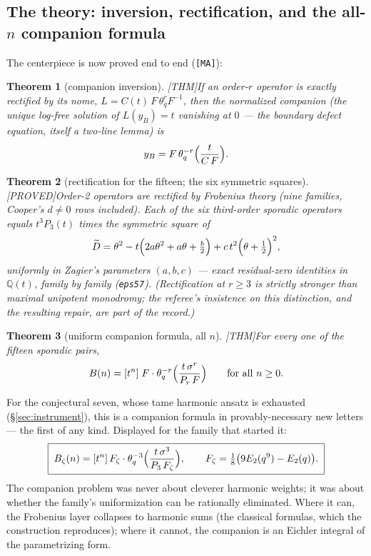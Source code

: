 \documentclass[11pt,reqno]{amsart}
\theoremstyle{plain}
\newtheorem{theorem}{Theorem}[section]
\theoremstyle{definition}
\theoremstyle{remark}
\newcommand{\Q}{\mathbb{Q}}
\newcommand{\thq}{\theta_q}
\newcommand{\Thm}{\textup{\textsf{[THM]}}}
\newcommand{\Proved}{\textup{\textsf{[PROVED]}}}
\newcommand{\MA}{\texttt{[MA]}}
\begin{document}
\subsection{The theory: inversion, rectification, and the all-$n$
companion formula}
The centerpiece is now proved end to end (\MA):

\begin{theorem}[companion inversion]\label{thm:inv}
\Thm\quad If an order-$r$ operator is exactly rectified by its nome,
$L=C(t)\,F\,\thq^rF^{-1}$, then the normalized companion (the unique
log-free solution of $L(y_B)=t$ vanishing at $0$ --- the \emph{boundary
defect} equation, itself a two-line lemma) is
\[
y_B=F\,\thq^{-r}\Bigl(\frac t{C\,F}\Bigr).
\]
\end{theorem}

\begin{theorem}[rectification for the fifteen; the six symmetric
squares]\label{thm:sym2}
\Proved\quad Order-2 operators are rectified by Frobenius theory (nine
families, Cooper's $d\neq0$ rows included). Each of the six third-order
sporadic operators equals $t^3P_3(t)$ times the symmetric square of
\[
\widetilde D=\theta^2-t\Bigl(2a\theta^2+a\theta+\tfrac b2\Bigr)
+c\,t^2\Bigl(\theta+\tfrac12\Bigr)^2,
\]
uniformly in Zagier's parameters $(a,b,c)$ --- exact residual-zero
identities in $\Q(t)$, family by family (\texttt{eps57}). (Rectification
at $r\ge3$ is strictly stronger than maximal unipotent monodromy; the
referee's insistence on this distinction, and the resulting repair, are
part of the record.)
\end{theorem}

\begin{theorem}[uniform companion formula, all $n$]\label{thm:comp}
\Thm\quad For every one of the fifteen sporadic pairs,
\[
B(n)=[t^n]\;F\cdot\thq^{-r}\Bigl(\frac{t\,\sigma^r}{P_r\,F}\Bigr)
\qquad\text{for all }n\ge0 .
\]
\end{theorem}

For the conjectural seven, whose tame harmonic ansatz is exhausted
(\S\ref{sec:instrument}), this is a companion formula in
provably-necessary new letters --- the first of any kind. Displayed for
the family that started it:
\[
\boxed{\;B_\zeta(n)=[t^n]\,F_\zeta\cdot\thq^{-3}
\Bigl(\frac{t\,\sigma^3}{P_3\,F_\zeta}\Bigr),\qquad
F_\zeta=\tfrac18\bigl(9E_2(q^9)-E_2(q)\bigr).\;}
\]
The companion problem was never about cleverer harmonic weights; it was
about whether the family's uniformization can be rationally eliminated.
Where it can, the Frobenius layer collapses to harmonic sums (the
classical formulas, which the construction reproduces); where it cannot,
the companion is an Eichler integral of the parametrizing form.
\end{document}
